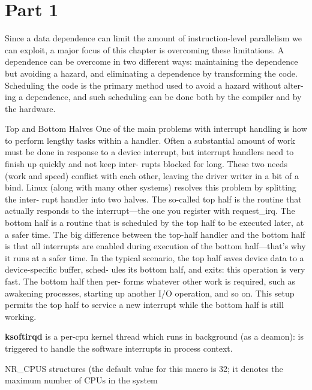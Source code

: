 \documentclass[10pt,a4paper]{article}
\begin{document}
\section{Part 1}

Since a data dependence can limit the amount of instruction-level parallelism
we can exploit, a major focus of this chapter is overcoming these limitations. A
dependence can be overcome in two different ways: maintaining the dependence
but avoiding a hazard, and eliminating a dependence by transforming the code.
Scheduling the code is the primary method used to avoid a hazard without alter-
ing a dependence, and such scheduling can be done both by the compiler and by
the hardware.












Top and Bottom Halves
One of the main problems with interrupt handling is how to perform lengthy tasks
within a handler. Often a substantial amount of work must be done in response to a
device interrupt, but interrupt handlers need to finish up quickly and not keep inter-
rupts blocked for long. These two needs (work and speed) conflict with each other,
leaving the driver writer in a bit of a bind.
Linux (along with many other systems) resolves this problem by splitting the inter-
rupt handler into two halves. The so-called top half is the routine that actually
responds to the interrupt—the one you register with request\_irq. The bottom half is a
routine that is scheduled by the top half to be executed later, at a safer time. The big
difference between the top-half handler and the bottom half is that all interrupts are
enabled during execution of the bottom half—that’s why it runs at a safer time. In
the typical scenario, the top half saves device data to a device-specific buffer, sched-
ules its bottom half, and exits: this operation is very fast. The bottom half then per-
forms whatever other work is required, such as awakening processes, starting up
another I/O operation, and so on. This setup permits the top half to service a new
interrupt while the bottom half is still working.


\textbf{ksoftirqd} is a per-cpu kernel thread which runs in background (as a deamon): is triggered to handle the software interrupts in process context.



 NR\_CPUS structures (the default value for this
macro is 32; it denotes the maximum number of CPUs in the system
\end{document}
